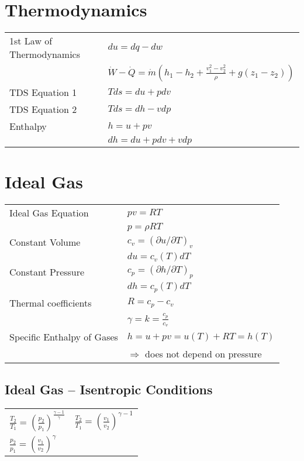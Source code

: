 \section*{Thermodynamics}
\begin{tabular}{ m{5cm} l}
    1st Law of Thermodynamics & $du = dq - dw$  \\
     & $\dot{W} - \dot{Q} = \dot{m} \left( h_1 - h_2 + \frac{v_1^2 - v_2^2}{\rho} + g \left(z_1 - z_2 \right) \right)$ \\
    TDS Equation 1 & $Tds = du + pdv$ \\
    TDS Equation 2 & $Tds = dh - vdp$ \\
    Enthalpy & $h = u + pv$ \\
     & $d h  = du + p dv + v dp$ \\
\end{tabular}

\section*{Ideal Gas}
\begin{tabular}{ m{5cm} l}
    Ideal Gas Equation & $pv = RT$ \\
     & $p = \rho R T$ \\
    Constant Volume & $c_v = (\partial u / \partial T)_v$ \\
     & $du = c_v (T) dT$ \\
     Constant Pressure & $c_p = (\partial h / \partial T)_p$ \\
     & $dh = c_p (T) dT$ \\
     Thermal coefficients & $R = c_p - c_v$ \\
      & $\gamma = k = \frac{c_p}{c_v}$ \\
      Specific Enthalpy of Gases & $h = u + pv = u(T) + RT = h(T)$ \\
       & $\Rightarrow$ does not depend on pressure
\end{tabular}

\subsection*{Ideal Gas – Isentropic Conditions}
\begin{tabular}{ m{5cm} l}
    $\frac{T_2}{T_1} = \left( \frac{p_2}{p_1} \right)^{ \frac{\gamma - 1}{\gamma}} $ & $\frac{T_2}{T_1} = \left( \frac{v_1}{v_2} \right)^{ \gamma -1 } $ \\
    $\frac{p_2}{p_1} = \left( \frac{v_1}{v_2} \right)^{ \gamma } $ & \\
\end{tabular}


